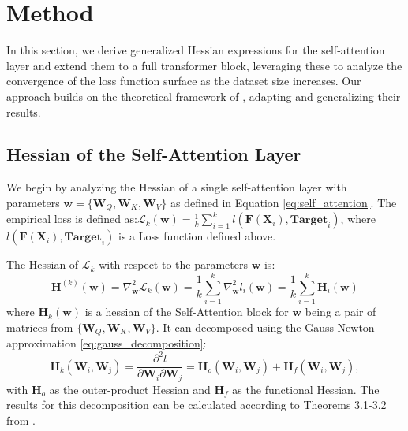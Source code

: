 \documentclass{article}
\begin{document}

\section{Method}\label{sec:method}

In this section, we derive generalized Hessian expressions for the self-attention layer and extend them to a full transformer block, leveraging these to analyze the convergence of the loss function surface as the dataset size increases. Our approach builds on the theoretical framework of \cite{ormaniec2024attentionhessian}, adapting and generalizing their results.

\subsection{Hessian of the Self-Attention Layer}\label{subsec:hessian_self_attention}

We begin by analyzing the Hessian of a single self-attention layer with parameters \(\mathbf{w} = \{\mathbf{W}_Q, \mathbf{W}_K, \mathbf{W}_V\}\) as defined in Equation \ref{eq:self_attention}. The empirical loss is defined as:$\mathcal{L}_k(\mathbf{w}) = \frac{1}{k} \sum_{i=1}^k l(\mathbf{F}(\mathbf{X}_i), \textbf{Target}_i)$, where \(l(\mathbf{F}(\mathbf{X}_i), \textbf{Target}_i)\) is a Loss function defined above.

The Hessian of \(\mathcal{L}_k\) with respect to the parameters \(\mathbf{w}\) is:
\[
\mathbf{H}^{(k)}(\mathbf{w}) = \nabla^2_{\mathbf{w}} \mathcal{L}_k(\mathbf{w}) = \frac{1}{k} \sum_{i=1}^k \nabla^2_{\mathbf{w}} l_i(\mathbf{w}) = \frac{1}{k} \sum_{i=1}^k \mathbf{H}_i(\mathbf{w})
\]
where $\mathbf{H}_k(\mathbf{w})$ is a hessian of the Self-Attention block for $\mathbf{w}$ being a pair of matrices from $\{ \mathbf{W}_Q, \mathbf{W}_K, \mathbf{W}_V\}$. It can decomposed using the Gauss-Newton approximation \ref{eq:gauss_decomposition}:
\[
\mathbf{H}_k(\mathbf{W}_i, \mathbf{W_j}) = \frac{\partial^2 l}{\partial \mathbf{W}_i \partial \mathbf{W}_j} = \mathbf{H}_o(\mathbf{W}_i, \mathbf{W}_j) + \mathbf{H}_f(\mathbf{W}_i, \mathbf{W}_j),
\]
with \(\mathbf{H}_o\) as the outer-product Hessian and \(\mathbf{H}_f\) as the functional Hessian. The results for this decomposition  can be calculated according to Theorems 3.1-3.2 from \cite{ormaniec2024attentionhessian}.

\end{document}
